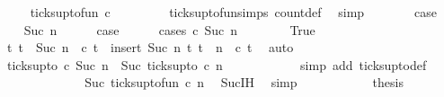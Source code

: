 \begin{isabellebody}
\ \isamarkupfalse%
\ {\isacartoucheopen}{\isachardot}{\isachardot}{\isachardot}\ {\isacharequal}\ ticks{\isacharunderscore}up{\isacharunderscore}to{\isacharunderscore}fun\ c\ {}{\isacartoucheclose}\isanewline
\ \ \ \ \ \ \isamarkupfalse%
\ ticks{\isacharunderscore}up{\isacharunderscore}to{\isacharunderscore}fun{\isachardot}simps{\isacharparenleft}{}{\isacharparenright}\ count{\isacharunderscore}def\ \isamarkupfalse%
\ simp\isanewline
\ \ \ \ \isamarkupfalse%
\ \isamarkupfalse%
\ {\isacharquery}case\ \isacommand{{\isachardot}}\isamarkupfalse%
\isanewline
{}\isamarkupfalse%
\isanewline
\ \ \isamarkupfalse%
\ {\isacharparenleft}Suc\ n{\isacharparenright}\isanewline
\ \ \ \ \isamarkupfalse%
\ {\isacharquery}case\isanewline
\ \ \ \ \isamarkupfalse%
\ {\isacharparenleft}cases\ {\isacartoucheopen}c\ {\isacharparenleft}Suc\ n{\isacharparenright}{\isacartoucheclose}{\isacharparenright}\isanewline
\ \ \ \ \ \ \isamarkupfalse%
\ True\isanewline
\ \ \ \ \ \ \ \ \isamarkupfalse%
\ {\isacartoucheopen}{\isacharbraceleft}t{\isachardot}\ t\ {\isasymle}\ Suc\ n\ {\isasymand}\ c\ t{\isacharbraceright}\ {\isacharequal}\ insert\ {\isacharparenleft}Suc\ n{\isacharparenright}\ {\isacharbraceleft}t{\isachardot}\ t\ {\isasymle}\ n\ {\isasymand}\ c\ t{\isacharbraceright}{\isacartoucheclose}\ \isamarkupfalse%
\ auto\isanewline
\ \ \ \ \ \ \ \ \isamarkupfalse%
\ {\isacartoucheopen}ticks{\isacharunderscore}up{\isacharunderscore}to\ c\ {\isacharparenleft}Suc\ n{\isacharparenright}\ {\isacharequal}\ Suc\ {\isacharparenleft}ticks{\isacharunderscore}up{\isacharunderscore}to\ c\ n{\isacharparenright}{\isacartoucheclose}\isanewline
\ \ \ \ \ \ \ \ \ \ \isamarkupfalse%
\ {\isacharparenleft}simp\ add{\isacharcolon}\ ticks{\isacharunderscore}up{\isacharunderscore}to{\isacharunderscore}def{\isacharparenright}\isanewline
\ \ \ \ \ \ \ \ \isamarkupfalse%
\ \isamarkupfalse%
\ {\isacartoucheopen}{\isachardot}{\isachardot}{\isachardot}\ {\isacharequal}\ Suc\ {\isacharparenleft}ticks{\isacharunderscore}up{\isacharunderscore}to{\isacharunderscore}fun\ c\ n{\isacharparenright}{\isacartoucheclose}\ \isamarkupfalse%
\ Suc{\isachardot}IH\ \isamarkupfalse%
\ simp\isanewline
\ \ \ \ \ \ \ \ \isamarkupfalse%
\ \isamarkupfalse%
\ {\isacharquery}thesis\ \isamarkupfalse%

\end{isabellebody}

